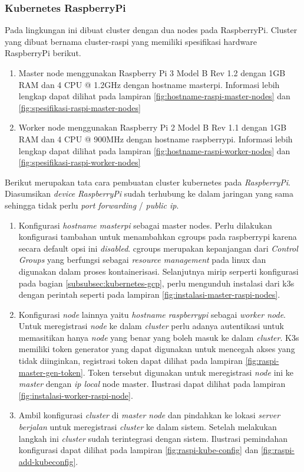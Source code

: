 \subsubsection{Kubernetes RaspberryPi}
Pada lingkungan ini dibuat cluster dengan dua nodes pada RaspberryPi. Cluster yang dibuat bernama cluster-raspi yang memiliki spesifikasi hardware RaspberryPi berikut.

\begin{enumerate}
    \item Master node menggunakan Raspberry Pi 3 Model B Rev 1.2 dengan 1GB RAM dan 4 CPU @ 1.2GHz dengan hostname masterpi. Informasi lebih lengkap dapat dilihat pada lampiran \ref{fig:hostname-raspi-master-nodes} dan \ref{fig:spesifikasi-raspi-master-nodes}
    \item Worker node menggunakan Raspberry Pi 2 Model B Rev 1.1 dengan 1GB RAM dan 4 CPU @ 900MHz dengan hostname raspberrypi. Informasi lebih lengkap dapat dilihat pada lampiran \ref{fig:hostname-raspi-worker-nodes} dan \ref{fig:spesifikasi-raspi-worker-nodes}
\end{enumerate}

Berikut merupakan tata cara pembuatan cluster kubernetes pada \textit{RaspberryPi}. Diasumsikan \textit{device} \textit{RaspberryPi} sudah terhubung ke dalam jaringan yang sama sehingga tidak perlu \textit{port forwarding} / \textit{public ip}.

\begin{enumerate}
    \item Konfigurasi \textit{hostname masterpi} sebagai master nodes. Perlu dilakukan konfigurasi tambahan untuk menambahkan cgroups pada raspberrypi karena secara default opsi ini \textit{disabled}. cgroups merupakan kepanjangan dari \textit{Control Groups} yang berfungsi sebagai \textit{resource management} pada linux dan digunakan dalam proses kontainerisasi. Selanjutnya mirip serperti konfigurasi pada bagian \ref{subsubsec:kubernetes-gcp}, perlu mengunduh instalasi dari k3s dengan perintah seperti pada lampiran \ref{fig:instalasi-master-raspi-nodes}.
    \item Konfigurasi \textit{node} lainnya yaitu \textit{hostname raspberrypi} sebagai \textit{worker node}. Untuk meregistrasi \textit{node} ke dalam \textit{cluster} perlu adanya autentikasi untuk memasitikan hanya \textit{node} yang benar yang boleh masuk ke dalam \textit{cluster}. K3s memiliki token generator yang dapat digunakan untuk mencegah akses yang tidak diinginkan, registrasi token dapat dilihat pada lampiran \ref{fig:raspi-master-gen-token}. Token tersebut digunakan untuk meregistrasi \textit{node} ini ke \textit{master} dengan \textit{ip local} node master. Ilustrasi dapat dilihat pada lampiran \ref{fig:instalasi-worker-raspi-node}.
    \item Ambil konfigurasi \textit{cluster} di \textit{master node} dan pindahkan ke lokasi \textit{server berjalan} untuk meregistrasi \textit{cluster} ke dalam sistem. Setelah melakukan langkah ini \textit{cluster} sudah terintegrasi dengan sistem. Ilustrasi pemindahan konfigurasi dapat dilihat pada lampiran \ref{fig:raspi-kube-config} dan \ref{fig:raspi-add-kubeconfig}.
\end{enumerate}
